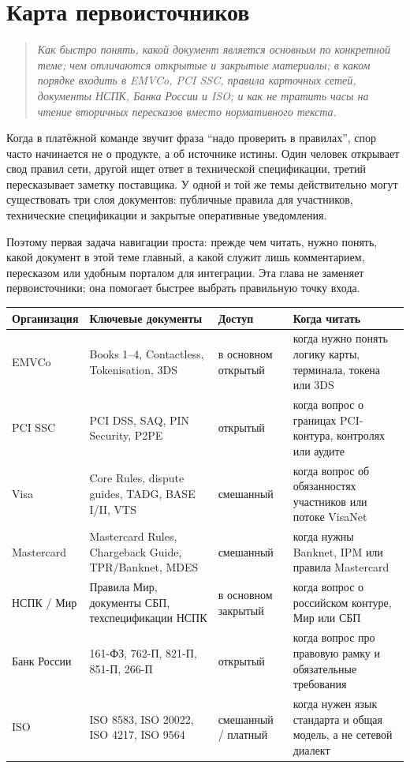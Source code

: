 
\chapter{Карта первоисточников}
\label{ch:primary-sources}
\begin{quote}
  \itshape
  Как быстро понять, какой документ является основным
  по конкретной теме; чем отличаются открытые и закрытые материалы;
  в каком порядке входить в EMVCo, PCI SSC, правила карточных сетей,
  документы НСПК, Банка России и ISO; и как не тратить часы
  на чтение вторичных пересказов вместо нормативного текста.
\end{quote}

Когда в платёжной команде звучит фраза \enquote{надо проверить
в правилах}, спор часто начинается не о продукте, а об источнике
истины. Один человек открывает свод правил сети, другой ищет ответ
в технической спецификации, третий пересказывает заметку поставщика.
У одной и той же темы действительно могут существовать три слоя
документов: публичные правила для участников, технические
спецификации и закрытые оперативные уведомления.

Поэтому первая задача навигации проста: прежде чем читать, нужно
понять, какой документ в этой теме главный, а какой служит лишь
комментарием, пересказом или удобным порталом для интеграции. Эта глава
не заменяет первоисточники; она помогает быстрее выбрать
правильную точку входа.

\begin{table}[h]
\centering
\scriptsize
\renewcommand{\arraystretch}{1.15}
\begin{tabular}{|p{1.8cm}|p{3.3cm}|p{2.0cm}|p{3.0cm}|}
\hline
\textbf{Организация} & \textbf{Ключевые документы} & \textbf{Доступ} & \textbf{Когда читать} \\
\hline
EMVCo & Books 1--4, Contactless, Tokenisation, 3DS & в основном открытый & когда нужно понять логику карты, терминала, токена или 3DS \\
\hline
PCI SSC & PCI DSS, SAQ, PIN Security, P2PE & открытый & когда вопрос о границах PCI-контура, контролях или аудите \\
\hline
Visa & Core Rules, dispute guides, TADG, BASE I/II, VTS & смешанный & когда вопрос об обязанностях участников или потоке VisaNet \\
\hline
Mastercard & Mastercard Rules, Chargeback Guide, TPR/Banknet, MDES & смешанный & когда нужны Banknet, IPM или правила Mastercard \\
\hline
НСПК / Мир & Правила Мир, документы СБП, техспецификации НСПК & в основном закрытый & когда вопрос о российском контуре, Мир или СБП \\
\hline
Банк России & 161-ФЗ, 762-П, 821-П, 851-П, 266-П & открытый & когда вопрос про правовую рамку и обязательные требования \\
\hline
ISO & ISO 8583, ISO 20022, ISO 4217, ISO 9564 & смешанный / платный & когда нужен язык стандарта и общая модель, а не сетевой диалект \\
\hline
\end{tabular}
\end{table}

